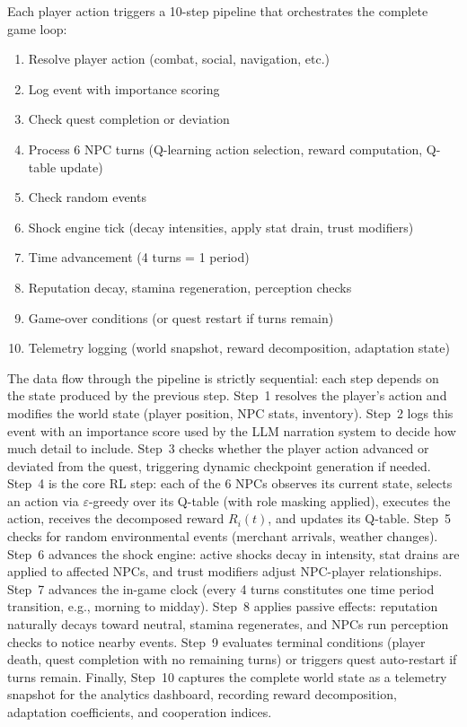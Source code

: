 \documentclass[12pt, a4paper, oneside]{report}
\begin{document}
Each player action triggers a 10-step pipeline that orchestrates the complete game loop:
\begin{enumerate}[nosep]
    \item Resolve player action (combat, social, navigation, etc.)
    \item Log event with importance scoring
    \item Check quest completion or deviation
    \item Process 6 NPC turns (Q-learning action selection, reward computation, Q-table update)
    \item Check random events
    \item Shock engine tick (decay intensities, apply stat drain, trust modifiers)
    \item Time advancement (4 turns = 1 period)
    \item Reputation decay, stamina regeneration, perception checks
    \item Game-over conditions (or quest restart if turns remain)
    \item Telemetry logging (world snapshot, reward decomposition, adaptation state)
\end{enumerate}

The data flow through the pipeline is strictly sequential: each step depends on the state produced by the previous step. Step~1 resolves the player's action and modifies the world state (player position, NPC stats, inventory). Step~2 logs this event with an importance score used by the LLM narration system to decide how much detail to include. Step~3 checks whether the player action advanced or deviated from the quest, triggering dynamic checkpoint generation if needed. Step~4 is the core RL step: each of the 6 NPCs observes its current state, selects an action via $\varepsilon$-greedy over its Q-table (with role masking applied), executes the action, receives the decomposed reward $R_i(t)$, and updates its Q-table. Step~5 checks for random environmental events (merchant arrivals, weather changes). Step~6 advances the shock engine: active shocks decay in intensity, stat drains are applied to affected NPCs, and trust modifiers adjust NPC-player relationships. Step~7 advances the in-game clock (every 4 turns constitutes one time period transition, e.g., morning to midday). Step~8 applies passive effects: reputation naturally decays toward neutral, stamina regenerates, and NPCs run perception checks to notice nearby events. Step~9 evaluates terminal conditions (player death, quest completion with no remaining turns) or triggers quest auto-restart if turns remain. Finally, Step~10 captures the complete world state as a telemetry snapshot for the analytics dashboard, recording reward decomposition, adaptation coefficients, and cooperation indices.
\end{document}
